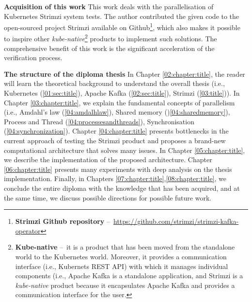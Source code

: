 \textbf{Acquisition of this work} \quad This work deals with the parallelisation of Kubernetes Strimzi system tests.
The author contributed the given code to the open-sourced project Strimzi available on Github\footnote{\textbf{Strimzi Github repository} \---\ \url{https://github.com/strimzi/strimzi-kafka-operator}}, which also makes it possible to inspire other \emph{kube-native}\footnote{\textbf{Kube-native} \---\ it is a product that has been moved from the standalone world to the Kubernetes world. Moreover, it provides a communication interface (i.e., Kubernets REST API) with which it manages individual components (i.e., Apache Kafka is a standalone application, and Strimzi is a \emph{kube-native} product because it encapsulates Apache Kafka and provides a communication interface for the user.} products to implement such solutions.
The comprehensive benefit of this work is the significant acceleration of the verification process.
\bigskip

\textbf{The structure of the diploma thesis} \quad In Chapter \ref{02:chapter:title}, the reader will learn the theoretical background to understand the overall thesis (i.e., Kubernetes (\ref{01:sec:title}), Apache Kafka (\ref{02:sec:title}), Strimzi (\ref{03:title})).
In Chapter \ref{03:chapter:title}, we explain the fundamental concepts of parallelism (i.e., Amdahl's law (\ref{04:amdalhlaw}), Shared memory ()\ref{04:sharedmemory}), Process and Thread (\ref{04:processesandthreads}), Synchronisation (\ref{04:synchronization}).
Chapter \ref{04:chapter:title} presents bottlenecks in the current approach of testing the Strimzi product and proposes a brand-new computational architecture that solves many issues.
In Chapter \ref{05:chapter:title}, we describe the implementation of the proposed architecture.
Chapter \ref{06:chapter:title} presents many experiments with deep analysis on the thesis implementation.
Finally, in Chapters \ref{07:chapter:title},\ref{08:chapter:title}, we conclude the entire diploma with the knowledge that has been acquired, and at the same time, we discuss possible directions for possible future work.
